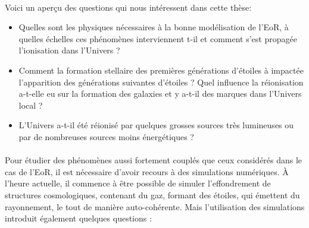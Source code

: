 %


\paragraph{}
Voici un aperçu des questions qui nous intéressent dans cette thèse: 

\begin{itemize}
\item Quelles sont les physiques nécessaires à la bonne modélisation de l'\ac{EoR}, à quelles échelles ces phénomènes interviennent t-il et comment s'est propagée l'ionisation dans l'Univers ?
\item Comment la formation stellaire des premières générations d'étoiles à impactée l'apparition des générations suivantes d'étoiles ? Quel influence la réionisation a-t-elle eu sur la formation des galaxies et y a-t-il des marques dans l'Univers local ?
\item L'Univers a-t-il été réionisé par quelques grosses sources très lumineuses ou par de nombreuses sources moins énergétiques ?
\end{itemize}

\paragraph{}

Pour étudier des phénomènes aussi fortement couplés que ceux considérés dans le cas de l'\ac{EoR}, il est nécessaire d'avoir recours à des simulations numériques. 
À l'heure actuelle, il commence à être possible de simuler l'effondrement de structures cosmologiques, contenant du gaz, formant des étoiles, qui émettent du rayonnement, le tout de manière auto-cohérente.
Mais l'utilisation des simulations introduit également quelques questions : 

